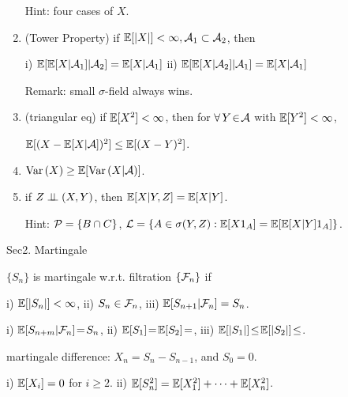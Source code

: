 \begin{prop}
\begin{enumerate}[leftmargin = 2em, label = (\alph*)]
        Hint: four cases of $X$.
        \item (Tower Property) if $\mathbb{E}[\lvert X \rvert] < \infty, \mathcal{A}_1 \subset \mathcal{A}_2$, then 
        
            i) $\mathbb{E}[ \mathbb{E}[X \vert \mathcal{A}_1] \vert \mathcal{A}_2] = \mathbb{E}[X \vert \mathcal{A}_1]$ 
            ii) $\mathbb{E}[ \mathbb{E}[X \vert \mathcal{A}_2] \vert \mathcal{A}_1] = \mathbb{E}[X \vert \mathcal{A}_1] $
            
            Remark: small $\sigma$-field always wins.
        \item (triangular eq) if $\mathbb{E}[X^2] < \infty$, then for $\forall\, Y \!\in\! \mathcal{A}$ with $\mathbb{E}[Y^2] < \infty$, 
            
            $\mathbb{E}[(X - \mathbb{E}[X \vert \mathcal{A}])^2] \leq \mathbb{E}[(X - Y)^2]$.
        \item $\text{Var}\left( X \right) \geq \mathbb{E}[\text{Var}\left( X \vert \mathcal{A} \right)]$.
        \item if $Z \perp\!\!\!\perp (X, Y)$, then $\mathbb{E}[X \vert Y, Z] = \mathbb{E}[X \vert Y]$.
            
            Hint: $\mathcal{P} = \{B \cap C\}$, $\mathcal{L} = \{A \in \sigma(Y, Z): \mathbb{E}[X 1_{A}] = \mathbb{E}[ \mathbb{E}[X \vert Y] 1_{A}]\}$.
    \end{enumerate}
\end{prop}



Sec2. Martingale \hrulefill 

\begin{defi}
    $\{S_n\}$ is martingale w.r.t. filtration $\{\mathcal{F}_n\}$ if 
    
    i) $\mathbb{E}[\lvert S_n \rvert] < \infty$, ii) $S_n \in \mathcal{F}_n$, iii) $\mathbb{E}[S_{n+1} \vert \mathcal{F}_n] = S_n$.
    
\end{defi}

\begin{fact}
    i) $\mathbb{E}[S_{n+m} \vert \mathcal{F}_n] \!=\! S_n$, ii) $\mathbb{E}[S_1] \!=\! \mathbb{E}[S_2] \!= $, iii) $\mathbb{E}[\lvert S_1 \rvert] \!\leq\! \mathbb{E}[\lvert S_2 \rvert] \!\leq $.
\end{fact}

\begin{defi}
    martingale difference: $X_n = S_n - S_{n-1}$, and $S_0 = 0$.
\end{defi}

\begin{fact}
    i) $\mathbb{E}[X_i] = 0$ for $i \geq 2$. ii) $\mathbb{E}[S_n^2] = \mathbb{E}[X_1^2] + \dots + \mathbb{E}[X_n^2]$.
\end{fact}

